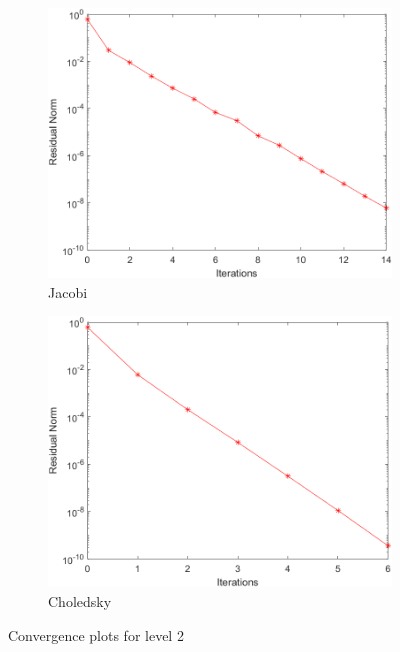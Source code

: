 \documentclass[a4paper, 11pt]{article}
\begin{document}
				\begin{figure}[H]
					\begin{subfigure}{.49\textwidth}
						\centering
						\includegraphics[width=.99\linewidth]{img2/J.png}  
						\caption{Jacobi}
						\label{fig:Jacobi_2}
					\end{subfigure}
					\begin{subfigure}{.49\textwidth}
						\centering
						\includegraphics[width=.99\linewidth]{img2/C.png}  
						\caption{Choledsky}
						\label{fig:Chol_2}
					\end{subfigure}
					\caption{Convergence plots for level 2}
					\label{fig:fig2}
				\end{figure}
			
\end{document}
